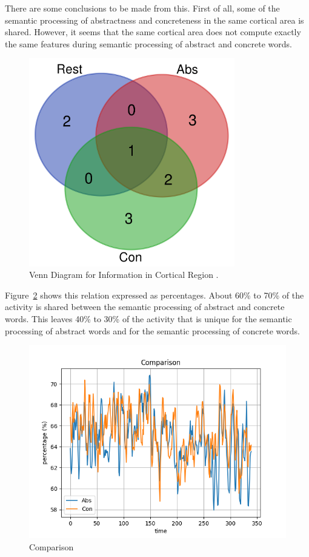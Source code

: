 There are some conclusions to be made from this. First of all, some of the semantic processing of abstractness and concreteness in the same cortical area is shared. However, it seems that the same cortical area does not compute exactly the same features during semantic processing of abstract and concrete words. 

\begin{figure}[!htb]
\caption{Venn Diagram for Information in Cortical Region \cite{venn}.}
\label{venn}
    \centering
    \includegraphics[width=0.8\textwidth]{fig/venn}
\end{figure}

Figure~\ref{comp-1} shows this relation expressed as percentages. About 60\% to 70\% of the activity is shared between the semantic processing of abstract and concrete words. This leaves 40\% to 30\% of the activity that is unique for the semantic processing of abstract words and for the semantic processing of concrete words.

\begin{figure}[!htb]
\caption{Comparison}
\label{comp-1}
    \centering
    \includegraphics[width=\textwidth]{fig/comp-1}
\end{figure}

